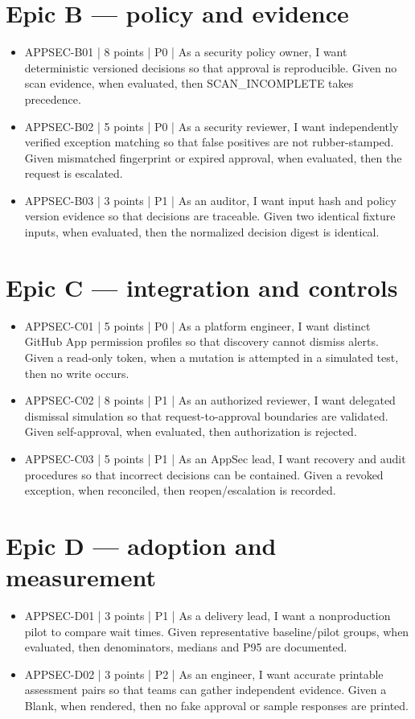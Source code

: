 \documentclass[11pt,letterpaper]{article}
\begin{document}
\section{Epic B — policy and evidence}
\begin{itemize}
\item APPSEC-B01 | 8 points | P0 | As a security policy owner, I want deterministic versioned decisions so that approval is reproducible. Given no scan evidence, when evaluated, then SCAN\_INCOMPLETE takes precedence.
\item APPSEC-B02 | 5 points | P0 | As a security reviewer, I want independently verified exception matching so that false positives are not rubber-stamped. Given mismatched fingerprint or expired approval, when evaluated, then the request is escalated.
\item APPSEC-B03 | 3 points | P1 | As an auditor, I want input hash and policy version evidence so that decisions are traceable. Given two identical fixture inputs, when evaluated, then the normalized decision digest is identical.
\end{itemize}

\section{Epic C — integration and controls}
\begin{itemize}
\item APPSEC-C01 | 5 points | P0 | As a platform engineer, I want distinct GitHub App permission profiles so that discovery cannot dismiss alerts. Given a read-only token, when a mutation is attempted in a simulated test, then no write occurs.
\item APPSEC-C02 | 8 points | P1 | As an authorized reviewer, I want delegated dismissal simulation so that request-to-approval boundaries are validated. Given self-approval, when evaluated, then authorization is rejected.
\item APPSEC-C03 | 5 points | P1 | As an AppSec lead, I want recovery and audit procedures so that incorrect decisions can be contained. Given a revoked exception, when reconciled, then reopen/escalation is recorded.
\end{itemize}

\section{Epic D — adoption and measurement}
\begin{itemize}
\item APPSEC-D01 | 3 points | P1 | As a delivery lead, I want a nonproduction pilot to compare wait times. Given representative baseline/pilot groups, when evaluated, then denominators, medians and P95 are documented.
\item APPSEC-D02 | 3 points | P2 | As an engineer, I want accurate printable assessment pairs so that teams can gather independent evidence. Given a Blank, when rendered, then no fake approval or sample responses are printed.
\end{itemize}
\end{document}
